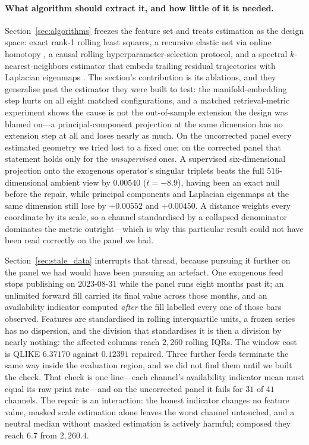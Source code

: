 \paragraph{What algorithm should extract it, and how little of it is needed.} Section~\ref{sec:algorithms} freezes the feature set and treats estimation as the design space: exact rank-1 rolling least squares, a recursive elastic net via online homotopy \citep{Garrigues2008}, a causal rolling hyperparameter-selection protocol, and a spectral $k$-nearest-neighbors estimator that embeds trailing residual trajectories with Laplacian eigenmaps \citep{BelkinNiyogi2003}. The section's contribution is its ablations, and they generalise past the estimator they were built to test: the manifold-embedding step hurts on all eight matched configurations, and a matched retrieval-metric experiment shows the cause is not the out-of-sample extension the design was blamed on---a principal-component projection at the same dimension has no extension step at all and loses nearly as much. On the uncorrected panel every estimated geometry we tried lost to a fixed one; on the corrected panel that statement holds only for the \emph{unsupervised} ones. A supervised six-dimensional projection onto the exogenous operator's singular triplets beats the full $516$-dimensional ambient view by $0.00540$ ($t = -8.9$), having been an exact null before the repair, while principal components and Laplacian eigenmaps at the same dimension still lose by $+0.00552$ and $+0.00450$. A distance weights every coordinate by its scale, so a channel standardised by a collapsed denominator dominates the metric outright---which is why this particular result could not have been read correctly on the panel we had.

Section~\ref{sec:stale_data} interrupts that thread, because pursuing it further on the panel we had would have been pursuing an artefact. One exogenous feed stops publishing on 2023-08-31 while the panel runs eight months past it; an unlimited forward fill carried its final value across those months, and an availability indicator computed \emph{after} the fill labelled every one of those bars observed. Features are standardised in rolling interquartile units, a frozen series has no dispersion, and the division that standardises it is then a division by nearly nothing: the affected columns reach $2{,}260$ rolling IQRs. The window cost is QLIKE $6.37170$ against $0.12391$ repaired. Three further feeds terminate the same way inside the evaluation region, and we did not find them until we built the check. That check is one line---each channel's availability indicator mean must equal its raw print rate---and on the uncorrected panel it fails for $31$ of $41$ channels. The repair is an interaction: the honest indicator changes no feature value, masked scale estimation alone leaves the worst channel untouched, and a neutral median without masked estimation is actively harmful; composed they reach $6.7$ from $2{,}260.4$.

